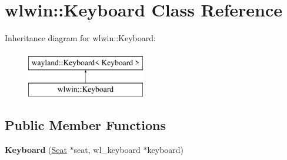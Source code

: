 \hypertarget{classwlwin_1_1Keyboard}{}\section{wlwin\+::Keyboard Class Reference}
\label{classwlwin_1_1Keyboard}
Inheritance diagram for wlwin\+::Keyboard\+:\begin{figure}[H]
\begin{center}
\leavevmode
\includegraphics[height=2.000000cm]{classwlwin_1_1Keyboard}
\end{center}
\end{figure}
\subsection*{Public Member Functions}
\begin{DoxyCompactItemize}
\item 
\mbox{\label{classwlwin_1_1Keyboard_a9c9876775e9b2515564a540d035e3fbc}} 
{\bfseries Keyboard} (\mbox{\hyperlink{classwlwin_1_1Seat}{Seat}} $\ast$seat, wl\+\_\+keyboard $\ast$keyboard)
\end{DoxyCompactItemize}
